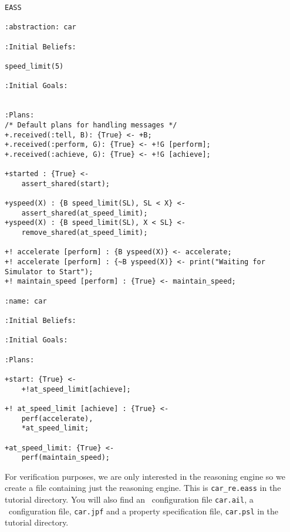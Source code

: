 \documentclass[a4]{article}
\begin{document}
\begin{lstlisting}[float,caption=A Simple EASS Program,basicstyle=\sffamily,style=easslisting,language=Gwendolen,label=code:example]
EASS

:abstraction: car

:Initial Beliefs:

speed_limit(5)
													
:Initial Goals:
		

:Plans: 
/* Default plans for handling messages */
+.received(:tell, B): {True} <- +B;   
+.received(:perform, G): {True} <- +!G [perform];
+.received(:achieve, G): {True} <- +!G [achieve];

+started : {True} <-
	assert_shared(start);

+yspeed(X) : {B speed_limit(SL), SL < X} <-
	assert_shared(at_speed_limit);
+yspeed(X) : {B speed_limit(SL), X < SL} <-
	remove_shared(at_speed_limit);
	
+! accelerate [perform] : {B yspeed(X)} <- accelerate;
+! accelerate [perform] : {~B yspeed(X)} <- print("Waiting for Simulator to Start");
+! maintain_speed [perform] : {True} <- maintain_speed;

:name: car
			
:Initial Beliefs:
													
:Initial Goals:
		
:Plans: 

+start: {True} <-
	+!at_speed_limit[achieve];

+! at_speed_limit [achieve] : {True} <-
	perf(accelerate),
	*at_speed_limit;

+at_speed_limit: {True} <-
	perf(maintain_speed);
\end{lstlisting} 

For verification purposes, we are only interested in the reasoning engine so we create a file containing just the reasoning engine.  This is \texttt{car\_re.eass} in the tutorial directory.  You will also find an \ail\ configuration file \texttt{car.ail}, a \jpf\ configuration file, \texttt{car.jpf} and a property specification file, \texttt{car.psl} in the tutorial directory.
\end{document}

